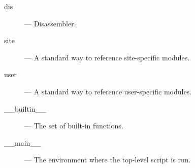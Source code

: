 \begin{description}
\item[dis]
--- Disassembler.

\item[site]
--- A standard way to reference site-specific modules.

\item[user]
--- A standard way to reference user-specific modules.

\item[__builtin__]
--- The set of built-in functions.

\item[__main__]
--- The environment where the top-level script is run.

\end{description}
